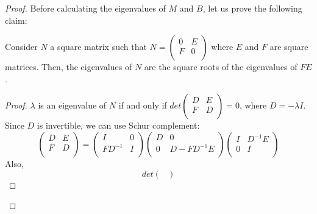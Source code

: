 \begin{problem}
\begin{sol}
\begin{proof}
            Before calculating the eigenvalues of $M$ and $B$, let us prove the following claim:
            \begin{claim}
                Consider $N$ a square matrix such that $N =
                \begin{pmatrix}
                    0 & E \\
                    F & 0 \\
                \end{pmatrix}$ where $E$ and $F$ are square matrices.
                Then, the eigenvalues of $N$ are the square roots of the eigenvalues of $F E$.
                \begin{proof}
                    $\lambda$ is an eigenvalue of $N$ if and only if $det
                    \begin{pmatrix}
                        D & E \\
                        F & D \\
                    \end{pmatrix} = 0
                    $, where $D = - \lambda I$.
                    Since $D$ is invertible, we can use Schur complement:
                    \[
                        \begin{pmatrix}
                            D & E \\
                            F & D \\
                        \end{pmatrix} =
                        \begin{pmatrix}
                            I       & 0 \\
                            FD^{-1} & I \\
                        \end{pmatrix}
                        \begin{pmatrix}
                            D & 0 \\
                            0 & D - FD^{-1}E \\
                        \end{pmatrix}
                        \begin{pmatrix}
                            I & D^{-1}E \\
                            0 & I \\
                        \end{pmatrix}
                    \]
                    Also, \[ det
                        \begin{pmatrix}

\end{pmatrix}\]
\end{proof}
\end{claim}
\end{proof}
\end{sol}
\end{problem}

